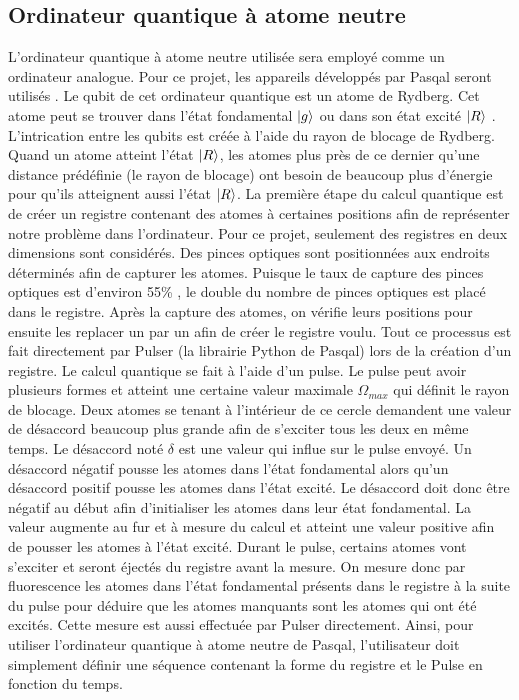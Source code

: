 \documentclass[11pt]{article}
\begin{document}
\subsection{Ordinateur quantique à atome neutre}
L'ordinateur quantique à atome neutre utilisée sera employé comme un ordinateur analogue. Pour ce projet, les appareils développés par Pasqal seront utilisés \cite{browaeys_quantum_2019}. Le qubit de cet ordinateur quantique est un atome de Rydberg. Cet atome peut se trouver dans l'état fondamental $\ket{g}$ ou dans son état excité $\ket{R}$ \cite{noauthor_learn_nodate}. L'intrication entre les qubits est créée à l'aide du rayon de blocage de Rydberg. Quand un atome atteint l'état $\ket{R}$, les atomes plus près de ce dernier qu'une distance prédéfinie (le rayon de blocage) ont besoin de beaucoup plus d'énergie pour qu'ils atteignent aussi l'état $\ket{R}$. La première étape du calcul quantique est de créer un registre contenant des atomes à certaines positions afin de représenter notre problème dans l'ordinateur. Pour ce projet, seulement des registres en deux dimensions sont considérés. Des pinces optiques sont positionnées \cite{browaeys_pinces_2016} aux endroits déterminés afin de capturer les atomes. Puisque le taux de capture des pinces optiques est d'environ 55\% \cite{muldoon_control_2012}, le double du nombre de pinces optiques est placé dans le registre. Après la capture des atomes, on vérifie leurs positions pour ensuite les replacer un par un afin de créer le registre voulu. Tout ce processus est fait directement par Pulser \cite{silverio_pulser_2022} (la librairie Python de Pasqal) lors de la création d'un registre. Le calcul quantique se fait à l'aide d'un pulse. Le pulse peut avoir plusieurs formes et atteint une certaine valeur maximale $\Omega_{max} $ qui définit le rayon de blocage.  Deux atomes se tenant à l'intérieur de ce cercle demandent une valeur de désaccord beaucoup plus grande afin de s'exciter tous les deux en même temps. Le désaccord noté $\delta$ est une valeur qui influe sur le pulse envoyé. Un désaccord négatif pousse les atomes dans l'état fondamental alors qu'un désaccord positif pousse les atomes dans l'état excité. Le désaccord doit donc être négatif au début afin d'initialiser les atomes dans leur état fondamental. La valeur augmente au fur et à mesure du calcul et atteint une valeur positive afin de pousser les atomes à l'état excité. Durant le pulse, certains atomes vont s'exciter et seront éjectés du registre avant la mesure. On mesure donc par fluorescence les atomes dans l'état fondamental présents dans le registre à la suite du pulse pour déduire que les atomes manquants sont les atomes qui ont été excités. Cette mesure est aussi effectuée par Pulser directement. Ainsi, pour utiliser l'ordinateur quantique à atome neutre de Pasqal, l'utilisateur doit simplement définir une séquence contenant la forme du registre et le Pulse en fonction du temps. 
\end{document}
